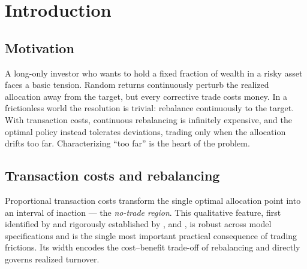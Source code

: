 \documentclass[11pt]{article}
\begin{document}
\begin{abstract}
\vspace{0.3em}
\noindent\textbf{JEL classification:} G11; C61; C63; C45.
\end{abstract}

\section{Introduction}

\subsection{Motivation}
A long-only investor who wants to hold a fixed fraction of wealth in a risky
asset faces a basic tension. Random returns continuously perturb the realized
allocation away from the target, but every corrective trade costs money. In a
frictionless world the resolution is trivial: rebalance continuously to the
\citet{merton1969} target. With transaction costs, continuous rebalancing is
infinitely expensive, and the optimal policy instead tolerates deviations,
trading only when the allocation drifts too far. Characterizing ``too far'' is
the heart of the problem.

\subsection{Transaction costs and rebalancing}
Proportional transaction costs transform the single optimal allocation point
into an interval of inaction --- the \emph{no-trade region}. This qualitative
feature, first identified by \citet{magillconstantinides1976} and rigorously
established by \citet{constantinides1986}, \citet{davisnorman1990} and
\citet{shrevesoner1994}, is robust across model specifications and is the single
most important practical consequence of trading frictions. Its width encodes the
cost--benefit trade-off of rebalancing and directly governs realized turnover.
\end{document}
